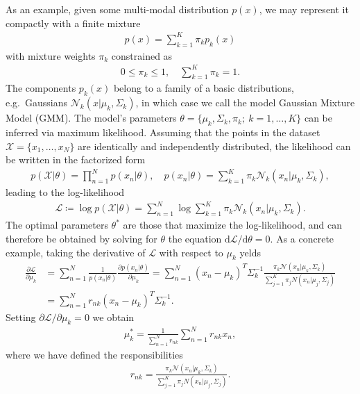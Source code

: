 As an example, given some multi-modal distribution $p(x)$, we may represent it compactly with a finite mixture
%
\begin{align}
p(x) = \sum_{k=1}^{K} \pi_{k} p_{k}(x)
\end{align}
%
with mixture weights $\pi_{k}$ constrained as
%
\begin{align}
0 \leq \pi_k \leq 1, \quad \sum_{k=1}^{K} \pi_{k} = 1.
\end{align}
%
The components $p_{k}(x)$ belong to a family of a basic distributions, e.g.\ Gaussians $\mathcal{N}_k(x | \mu_k, \Sigma_k)$, in which case we call the model Gaussian Mixture Model (GMM). The model's parameters $\theta = \{ \mu_k, \Sigma_k, \pi_k; ~ k = 1, \ldots, K \}$ can be inferred via maximum likelihood. Assuming that the points in the dataset $\mathcal{X} = \{x_1, \ldots , x_N \}$ are identically and independently distributed, the likelihood can be written in the factorized form
%
\begin{align}
p(\mathcal{X} | \theta ) = \prod_{n=1}^N p(x_n | \theta), \quad p(x_n | \theta) = \sum_{k=1}^K \pi_k \mathcal{N}_k(x_n | \mu_k, \Sigma_k),
\end{align}
%
leading to the log-likelihood
%
\begin{align}
\mathcal{L} \coloneqq \log p(\mathcal{X} | \theta ) = \sum_{n=1}^N \log \sum_{k=1}^K \pi_k \mathcal{N}_k(x_n | \mu_k, \Sigma_k).
\end{align}
%
The optimal parameters $\theta^{*}$ are those that maximize the log-likelihood, and can therefore be obtained by solving for $\theta$ the equation $\text{d} \mathcal{L} / \text{d}\theta = 0$.
As a concrete example, taking the derivative of $\mathcal{L}$ with respect to $\mu_{k}$ yelds
%
\begin{align}
\frac{\partial \mathcal{L}}{\partial \mu_k} &= \sum_{n=1}^{N} \frac{1}{p(x_n | \theta)} \frac{\partial p(x_n | \theta) }{\partial \mu_k} = \sum_{n=1}^{N} (x_n - \mu_k)^{T} \Sigma_k^{-1} \frac{\pi_k \mathcal{N}(x_n | \mu_k, \Sigma_k)}{\sum_{j=1}^{K} \pi_j N(x_n | \mu_j, \Sigma_j) } \\
&= \sum_{n=1}^{N} r_{nk} (x_n - \mu_k)^{T} \Sigma_k^{-1} .
\end{align}
%
Setting $\partial \mathcal{L} / \partial \mu_k  = 0$ we obtain
%
\begin{align}
\mu_k^{*} = \frac{1}{ \sum_{n=1}^{N} r_{nk}} \sum_{n=1}^{N} r_{nk} x_n,
\end{align}
%
where we have defined the responsibilities
%
\begin{align}
r_{nk} = \frac{\pi_k \mathcal{N}(x_n | \mu_k, \Sigma_k)}{\sum_{j=1}^{K} \pi_j N(x_n | \mu_j, \Sigma_j) }.
\end{align}
